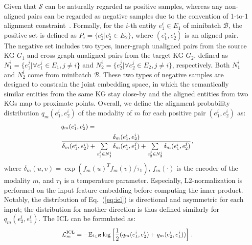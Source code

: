 \documentclass[11pt]{article}
\begin{document}
Given that $\mathcal{S}$ can be naturally regarded as positive samples, whereas any non-aligned pairs can be regarded as negative samples due to the convention of 1-to-1 alignment constraint~\cite{sun2018bootstrapping}. 
Formally, for the $i$-th entity $e^i_1\in E_1$ of minibatch $\mathcal{B}$, the positive set is defined as ${P_i}=\{e^i_2|e^i_2\in E_2\}$, where $(e^i_1,e^i_2)$ is an aligned pair.
The negative set includes two types, inner-graph unaligned pairs from the source KG $G_1$ and cross-graph unaligned pairs from the target KG $G_2$, defined as $N^i_1=\{e^j_1|\forall{e}^j_1\in{E_1}, j\neq{i}\}$ and $N^i_2=\{e^j_2|\forall{e}^j_2\in{E_2},j\neq{i}\}$, respectively.
Both $N^i_1$ and $N^i_2$ come from minibatch $\mathcal{B}$.
These two types of negative samples are designed to constrain the joint embedding space, in which  the semantically similar entities from the same KG stay close-by and the aligned entities from two KGs map to proximate points. 
Overall, we define the alignment probability distribution $q_m(e^i_1,e^i_2)$ of the modality of $m$ for each positive pair $(e^i_1,e^i_2)$ as:
\begin{equation}
\begin{small}
\begin{aligned}
    & q_m(e^i_1,e^i_2)= \\
    & \frac{\delta_m{(e^i_1,e^i_2})}{
    \delta_m{(e^i_1,e^i_2)} +
    \sum\limits_{e^j_1\in{N}^i_1}\delta_m(e^i_1,e^j_1) + \sum\limits_{e^j_2\in{N}^i_2}\delta_m(e^i_1,e^j_2)
},
    \label{eq:icl}
\end{aligned}
\end{small}
\end{equation}
where $\delta_m(u,v)=\exp(f_m(u)^Tf_m(v)/\tau_1)$, $f_m(\cdot)$ is the encoder of the modality $m$, and $\tau_1$ is a temperature parameter.
Especially, L2-normalization is performed on the input feature embedding before computing the inner product.
Notably, the distribution of Eq.~(\ref{eq:icl}) is directional and asymmetric for each input; the distribution for another direction is thus defined similarly for $q_m(e^i_2,e^i_1)$. 
The ICL can be formulated as:
\begin{equation}
\begin{small}
\begin{aligned}
    \mathcal{L}^{\text{ICL}}_m = - \mathbb{E}_{i\in\mathcal{B}}
    \log
    \left[
    \frac{1}{2}
    (q_m(e^i_1,e^i_2) + q_m(e^i_2,e^i_1))
    \right].
\end{aligned}
\end{small}
\end{equation}
\end{document}
